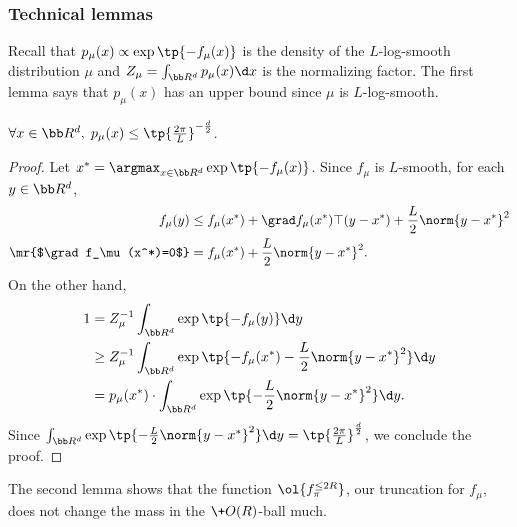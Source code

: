 \subsubsection{Technical lemmas}\label{sec:ub-tech}

Recall that $p_\mu(x)\propto \exp\tp{-f_\mu(x)}$ is the density of the $L$-log-smooth distribution $\mu$ and $Z_\mu = \int_{\bb R^d} p_\mu(x)\d x$ is the normalizing factor. The first lemma says that $p_\mu(x)$ has an upper bound since $\mu$ is $L$-log-smooth. 

\begin{lemma}\label{lem:mu-bound}
    $\forall x\in \bb R^d,\;p_\mu(x) \le \tp{\frac{2\pi}{L}}^{-\frac{d}{2}}$.
\end{lemma}
\begin{proof}
    Let $x^* = \argmax_{x\in\bb R^d} \exp\tp{-f_\mu(x)}$. Since $f_\mu$ is $L$-smooth, for each $y\in \bb R^d$,
    \begin{align*}
        f_\mu(y)
        &\le f_\mu(x^*) + \grad f_\mu(x^*)\top (y-x^*) + \frac{L}{2}\norm{y-x^*}^2\\
        \mr{$\grad f_\mu(x^*)=0$}
        &=f_\mu(x^*)+ \frac{L}{2}\norm{y-x^*}^2.
    \end{align*}
    On the other hand, 
    \begin{align*}
        1
        &=Z_\mu^{-1} \int_{\bb R^d} \exp\tp{-f_\mu(y)} \d y\\
        &\ge Z_{\mu}^{-1}\int_{\bb R^d} \exp\tp{-f_\mu(x^*)-\frac{L}{2}\norm{y-x^*}^2} \d y\\
        &= p_\mu(x^*)\cdot\int_{\bb R^d} \exp\tp{-\frac{L}{2}\norm{y-x^*}^2}\d y.
    \end{align*}
    Since $\int_{\bb R^d} \exp\tp{-\frac{L}{2}\norm{y-x^*}^2}\d y = \tp{\frac{2\pi}{L}}^{\frac{d}{2}}$, we conclude the proof. 
\end{proof}

The second lemma shows that the function $\ol{f^{\le 2R}_{\pi}}$, our truncation for $f_\mu$, does not change the mass in the $\+O(R)$-ball much. 

